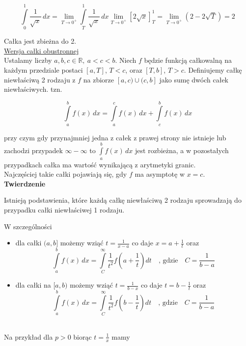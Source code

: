 $$ \int\limits_{0}^{1} \frac{1}{\sqrt{x}} \,dx = \lim_{T \to 0^+} \int\limits_{T}^{1} \frac{1}{\sqrt{x}} \,dx
\lim_{T \to 0^+} [2\sqrt{x}]_T^1 = \lim_{T \to 0^+} (2 - 2\sqrt{T}) = 2 $$

Całka jest zbieżna do 2. \\

\underline{Wersja całki obustronnej} \\

Ustalamy liczby $ a,b,c \in \mathbb{R}, \ a < c < b $. Niech $f$ będzie funkcją całkowalną na każdym przedziale postaci
$[a,T]$, $T < c$, oraz $ [T, b] $, $ T > c $. Definiujemy całkę niewłaściwą 2 rodzaju z $f$ na zbiorze $[a, c)\cup(c, b] $
jako sumę dwóch całek niewłaściwych. tzn.

$$ \int\limits_{a}^{b} f(x) \,dx = \int\limits_{a}^{c} f(x) \,dx + \int\limits_{c}^{b} f(x) \,dx $$

przy czym gdy przynajmniej jedna z całek z prawej strony nie istnieje lub zachodzi przypadek $ \infty - \infty $ to
$ \int\limits_{a}^{b} f(x) \,dx $ jest rozbieżna, a w pozostałych przypadkach całka ma wartość wynikającą z arytmetyki granic. \\

Najczęściej takie całki pojawiają się, gdy $f$ ma asymptotę w $x = c$. \\

\textbf{Twierdzenie}

Istnieją podstawienia, które każdą całkę niewłaściwą 2 rodzaju sprowadzają do przypadku całki niewłaściwej 1 rodzaju.

W szczególności

\begin{itemize}
    \item dla całki $(a,b]$ możemy wziąć $ t = \frac{1}{x - a} $ co daje $ x = a + \frac{1}{t} $ oraz
    $$ \int\limits_{a}^{b} f(x) \,dx = \int\limits_{C}^{\infty} \frac{1}{t^2} f \left(a + \frac{1}{t} \right) dt \quad
    \textrm{, gdzie} \quad C = \frac{1}{b - a} $$

    \item dla całki na $[a,b)$ możemy wziąć $t = \frac{1}{b - x}$ co daje $ t = b - \frac{1}{t} $ oraz
    $$ \int\limits_{a}^{b} f(x) \,dx = \int\limits_{C}^{\infty} \frac{1}{t^2} f \left(b - \frac{1}{t} \right) dt \quad
    \textrm{, gdzie} \quad C = \frac{1}{b - a} $$ \\
\end{itemize}

Na przykład dla $ p > 0 $ biorąc $ t = \frac{1}{x} $ mamy 

